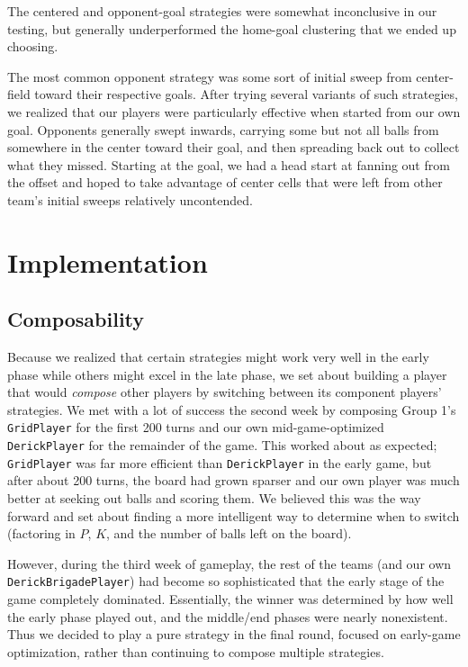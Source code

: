 \documentclass[
10pt, %
letterpaper, %
oneside, %
headinclude,footinclude, %
english
]{article}
\begin{document}
The centered and opponent-goal strategies were somewhat inconclusive in our testing, but generally underperformed the home-goal clustering that we ended up choosing.

The most common opponent strategy was some sort of initial sweep from center-field toward their respective goals. After trying several variants of such strategies, we realized that our players were particularly effective when started from our own goal. Opponents generally swept inwards, carrying some but not all balls from somewhere in the center toward their goal, and then spreading back out to collect what they missed. Starting at the goal, we had a head start at fanning out from the offset and hoped to take advantage of center cells that were left from other team's initial sweeps relatively uncontended.
\section{Implementation}

\subsection{Composability}
Because we realized that certain strategies might work very well in the early phase while others might excel in the late phase, we set about building a player that would \textit{compose} other players by switching between its component players' strategies. We met with a lot of success the second week by composing Group 1's \texttt{GridPlayer} for the first 200 turns and our own mid-game-optimized \texttt{DerickPlayer} for the remainder of the game. This worked about as expected; \texttt{GridPlayer} was far more efficient than \texttt{DerickPlayer} in the early game, but after about 200 turns, the board had grown sparser and our own player was much better at seeking out balls and scoring them. We believed this was the way forward and set about finding a more intelligent way to determine when to switch (factoring in $P$, $K$, and the number of balls left on the board).

However, during the third week of gameplay, the rest of the teams (and our own \texttt{DerickBrigadePlayer}) had become so sophisticated that the early stage of the game completely dominated. Essentially, the winner was determined by how well the early phase played out, and the middle/end phases were nearly nonexistent. Thus we decided to play a pure strategy in the final round, focused on early-game optimization, rather than continuing to compose multiple strategies.
\end{document}
